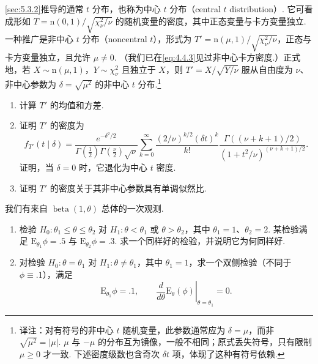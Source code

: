 \begin{exercise}\label{exercise:8.35}
\autoref{sec:5.3.2}推导的通常 $t$ 分布，也称为中心 $t$ 分布（central $t$ distribution\mbox{）.} 它可看成形如 $T=\mathrm n(0,1)/\sqrt{\chi_\nu^2/\nu}$ 的随机变量的密度，其中正态变量与卡方变量独立. 一种推广是非中心 $t$ 分布（noncentral $t$），形式为 $T'=\mathrm n(\mu,1)/\sqrt{\chi_\nu^2/\nu}$，正态与卡方变量独立，且允许 $\mu\ne0$. （我们已在\eqref{eq:4.4.3}见过非中心卡方密度.）正式地，若 $X\sim\mathrm n(\mu,1)$，$Y\sim\chi_\nu^2$ 且独立于 $X$，则 $T'=X/\sqrt{Y/\nu}$ 服从自由度为 $\nu$、非中心参数为 $\delta=\sqrt{\mu^2}$ 的非中心 $t$ 分布.\footnote{译注：对有符号的非中心 $t$ 随机变量，此参数通常应为 $\delta=\mu$，而非 $\sqrt{\mu^2}=|\mu|$. $\mu$ 与 $-\mu$ 的分布互为镜像，一般不相同；原式丢失符号，只有限制 $\mu\ge0$ 才一致. 下述密度级数也含奇次 $\delta t$ 项，体现了这种有符号依赖.}
\begin{enumerate}
\item 计算 $T'$ 的均值和方差.
\item 证明 $T'$ 的密度为
$$f_{T'}(t\mid\delta)=\frac{e^{-\delta^2/2}}{\Gamma(\frac12)\Gamma(\frac\nu2)\sqrt\nu}
\sum_{k=0}^\infty\frac{(2/\nu)^{k/2}(\delta t)^k}{k!}
\frac{\Gamma((\nu+k+1)/2)}{(1+t^2/\nu)^{(\nu+k+1)/2}}.$$
证明，当 $\delta=0$ 时，它退化为中心 $t$ 密度.
\item 证明 $T'$ 的密度关于其非中心参数具有单调似然比.
\end{enumerate}
\end{exercise}
\begin{exercise}\label{exercise:8.36}
我们有来自 $\operatorname{beta}(1,\theta)$ 总体的一次观测.
\begin{enumerate}
\item 检验 $H_0:\theta_1\le\theta\le\theta_2$ 对 $H_1:\theta<\theta_1\text{ 或 }\theta>\theta_2$，其中 $\theta_1=1$、$\theta_2=2$. 某检验满足 $\mathrm E_{\theta_1}\phi=.5$ 与 $\mathrm E_{\theta_2}\phi=.3$. 求一个同样好的检验，并说明它为何同样好.
\item 对检验 $H_0:\theta=\theta_1$ 对 $H_1:\theta\ne\theta_1$，其中 $\theta_1=1$，求一个双侧检验（不同于 $\phi\equiv.1$），满足
$$\mathrm E_{\theta_1}\phi=.1,\qquad\left.\frac d{d\theta}\mathrm E_\theta(\phi)\right|_{\theta=\theta_1}=0.$$
\end{enumerate}
\end{exercise}
